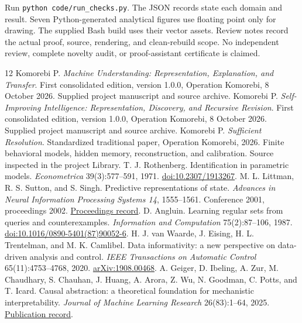 \documentclass[11pt,letterpaper]{article}
\theoremstyle{plain}
\theoremstyle{definition}
\begin{document}
Run \texttt{python code/run\_checks.py}. The JSON records state each domain and result. Seven Python-generated analytical figures use floating point only for drawing. The supplied Bash build uses their vector assets. Review notes record the actual proof, source, rendering, and clean-rebuild scope. No independent review, complete novelty audit, or proof-assistant certificate is claimed.

\begin{thebibliography}{12}\small
{} Komorebi P. \emph{Machine Understanding: Representation, Explanation, and Transfer}. First consolidated edition, version 1.0.0, Operation Komorebi, 8 October 2026. Supplied project manuscript and source archive.
 Komorebi P. \emph{Self-Improving Intelligence: Representation, Discovery, and Recursive Revision}. First consolidated edition, version 1.0.0, Operation Komorebi, 8 October 2026. Supplied project manuscript and source archive.
 Komorebi P. \emph{Sufficient Resolution}. Standardized traditional paper, Operation Komorebi, 2026. Finite behavioral models, hidden memory, reconstruction, and calibration. Source inspected in the project Library.
 T. J. Rothenberg. Identification in parametric models. \emph{Econometrica} 39(3):577--591, 1971. \href{https://www.jstor.org/stable/1913267}{doi:10.2307/1913267}.
 M. L. Littman, R. S. Sutton, and S. Singh. Predictive representations of state. \emph{Advances in Neural Information Processing Systems 14}, 1555--1561. Conference 2001, proceedings 2002. \href{https://papers.nips.cc/paper_files/paper/2001/hash/1e4d36177d71bbb3558e43af9577d70e-Abstract.html}{Proceedings record}.
 D. Angluin. Learning regular sets from queries and counterexamples. \emph{Information and Computation} 75(2):87--106, 1987. \href{https://doi.org/10.1016/0890-5401(87)90052-6}{doi:10.1016/0890-5401(87)90052-6}.
 H. J. van Waarde, J. Eising, H. L. Trentelman, and M. K. Camlibel. Data informativity: a new perspective on data-driven analysis and control. \emph{IEEE Transactions on Automatic Control} 65(11):4753--4768, 2020. \href{https://arxiv.org/abs/1908.00468}{arXiv:1908.00468}.
 A. Geiger, D. Ibeling, A. Zur, M. Chaudhary, S. Chauhan, J. Huang, A. Arora, Z. Wu, N. Goodman, C. Potts, and T. Icard. Causal abstraction: a theoretical foundation for mechanistic interpretability. \emph{Journal of Machine Learning Research} 26(83):1--64, 2025. \href{https://jmlr.org/papers/v26/23-0058.html}{Publication record}.

\end{thebibliography}
\end{document}
